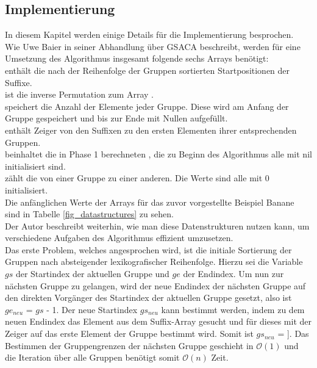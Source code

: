 \newpage
\subsection{Implementierung}
\label{gsaca:chapter5}
%
In diesem Kapitel werden einige Details für die Implementierung besprochen. \\

Wie Uwe Baier in seiner Abhandlung über GSACA beschreibt, werden für eine Umsetzung des Algorithmus insgesamt folgende sechs Arrays benötigt:\\
\sa enthält die nach der Reihenfolge der Gruppen sortierten Startpositionen der Suffixe. \\
\isa ist die inverse Permutation zum Array \sa. \\
\gsize speichert die Anzahl der Elemente jeder Gruppe. 
Diese wird am Anfang der Gruppe gespeichert und bis zur Ende mit Nullen aufgefüllt.\\
\glink enthält Zeiger von den Suffixen zu den ersten Elementen ihrer entsprechenden Gruppen. \\
\prev beinhaltet die in Phase 1 berechneten \prevpointer, die zu Beginn des Algorithmus alle mit nil initialisiert sind.\\
\pc zählt die \prevpointer von einer Gruppe zu einer anderen. 
Die Werte sind alle mit 0 initialisiert.\\
Die anfänglichen Werte der Arrays für das zuvor vorgestellte Beispiel Banane sind in Tabelle \ref{fig_datastructures} zu sehen.\\



Der Autor beschreibt weiterhin, wie man diese Datenstrukturen nutzen kann, um verschiedene Aufgaben des Algorithmus effizient umzusetzen.\\

Das erste Problem, welches angesprochen wird, ist die initiale Sortierung der Gruppen nach absteigender lexikografischer Reihenfolge. 
Hierzu sei die Variable $gs$ der Startindex der aktuellen Gruppe und $ge$ der Endindex. 
Um nun zur nächsten Gruppe zu gelangen, wird der neue Endindex der nächsten Gruppe auf den direkten Vorgänger des Startindex der aktuellen Gruppe gesetzt, also ist $ge_{neu}$ = $gs$ - 1. 
Der neue Startindex $gs_{neu}$ kann bestimmt werden, indem zu dem neuen Endindex das Element aus dem Suffix-Array \sa gesucht und für dieses mit \glink der Zeiger auf das erste Element der Gruppe bestimmt wird. 
Somit ist $gs_{neu}$ = \glink[\sa[$gs - a$]]. 
Das Bestimmen der Gruppengrenzen der nächsten Gruppe geschieht in $\mathcal O(1)$ und die Iteration über alle Gruppen benötigt somit $\mathcal O(n)$ Zeit.\\

